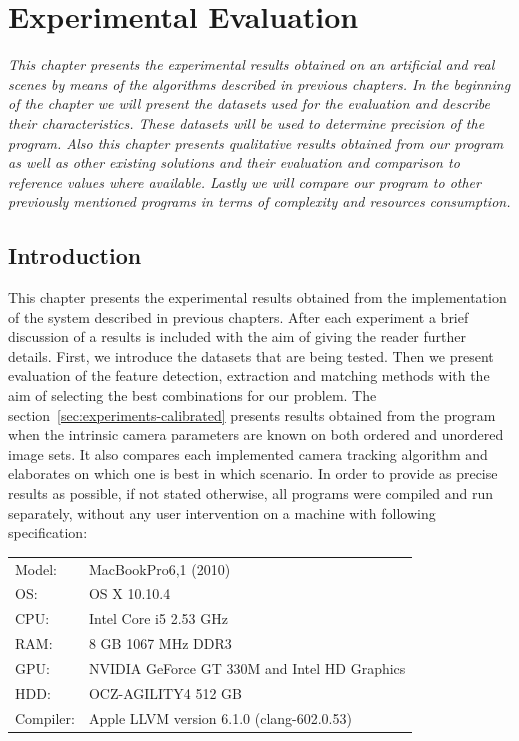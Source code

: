 \chapter{Experimental Evaluation}
\label{chapter:experiments}
\textit{This chapter presents the experimental results obtained on an artificial and real scenes by means of the algorithms described in previous chapters. In the beginning of the chapter we will present the datasets used for the evaluation and describe their characteristics. These datasets will be used to determine precision of the program. Also this chapter presents qualitative results obtained from our program as well as other existing solutions and their evaluation and comparison to reference values where available. Lastly we will compare our program to other previously mentioned programs in terms of complexity and resources consumption. }
\section{Introduction}
\label{sec:experiments-introduction}
This chapter presents the experimental results obtained from the implementation of the system described in previous chapters. After each experiment a brief discussion of a results is included with the aim of giving the reader further details. First, we introduce the datasets that are being tested. Then we present evaluation of the feature detection, extraction and matching methods with the aim of selecting the best combinations for our problem. The section~\ref{sec:experiments-calibrated} presents results obtained from the program when the intrinsic camera parameters are known on both ordered and unordered image sets. It also compares each implemented camera tracking algorithm and elaborates on which one is best in which scenario.  In order to provide as precise results as possible, if not stated otherwise, all programs were compiled and run separately, without any user intervention on a machine with following specification:
\vspace{.5cm}

\begin{tabular}{ l  l }
	Model: & MacBookPro6,1 (2010) \\
	OS: & OS X 10.10.4 \\
	CPU: & Intel Core i5 2.53 GHz \\
	RAM: & 8 GB 1067 MHz DDR3 \\
	GPU: & NVIDIA GeForce GT 330M and Intel HD Graphics  \\
	HDD: & OCZ-AGILITY4 512 GB \\
	Compiler: & Apple LLVM version 6.1.0 (clang-602.0.53) \\
\end{tabular}

